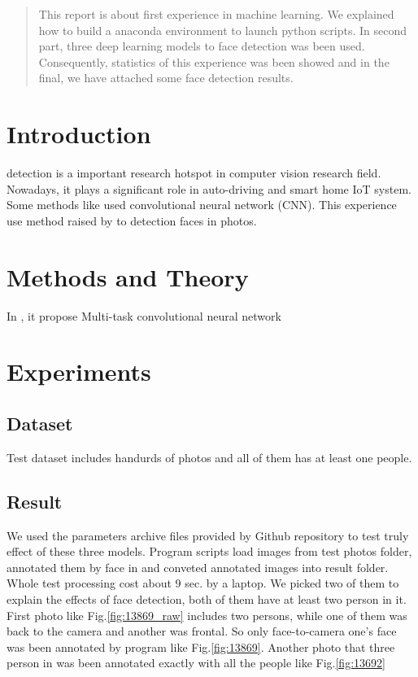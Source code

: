 \documentclass[journal, a4paper]{IEEEtran}
\begin{document}
\begin{abstract}
This report is about first experience in machine learning. We explained how to build a anaconda environment to launch python scripts. In second part, three deep learning models to face detection was been used. Consequently, statistics of this experience was been showed and in the final, we have attached some face detection results.
\end{abstract}

\section{Introduction}
 detection is a important research hotspot in computer vision research field. Nowadays, it plays a significant role in auto-driving and smart home IoT system. Some methods like \cite{ZHAN201619} used convolutional neural network (CNN). This experience use method raised by \cite{8080244} to detection faces in photos.

\section{Methods and Theory}
In \cite{8080244}, it propose Multi-task convolutional neural network

\section{Experiments}
\subsection{Dataset}
Test dataset includes handurds of photos and all of them has at least one people.

\subsection{Result}
We used the parameters archive files provided by Github repository to test truly effect of these three models. Program scripts load images from test photos folder, annotated them by face in and conveted annotated images into result folder. Whole test processing cost about 9 sec. by a laptop. We picked two of them to explain the effects of face detection, both of them have at least two person in it. First photo like Fig.\ref{fig:13869_raw} includes two persons, while one of them was back to the camera and another was frontal. So only face-to-camera one's face was been annotated by program like Fig.\ref{fig:13869}. Another photo that three person in was been annotated exactly with all the people like Fig.\ref{fig:13692}
\end{document}
